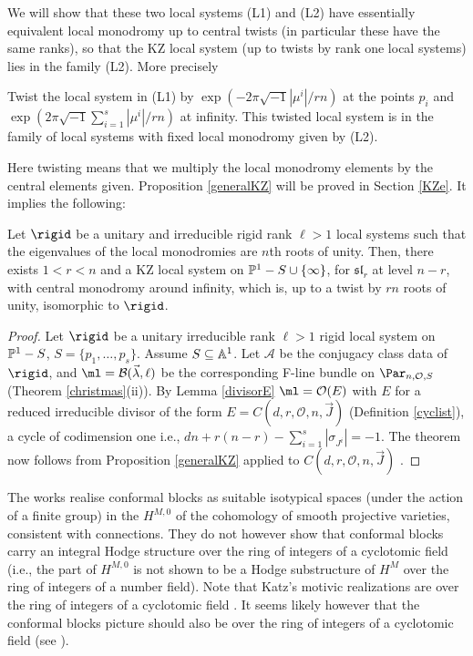 We will show that these two local systems (L1) and (L2) have essentially equivalent local monodromy up to central twists (in particular these have the same ranks), so that the KZ local system
(up to twists by rank one local systems) lies in the family (L2). More precisely
\begin{proposition}
\notready\label{generalKZ}
Twist the local system in (L1) by $\exp(-2\pi\sqrt{-1}|\mu^i|/rn)$ at the points $p_i$ and $\exp(2\pi\sqrt{-1}\sum_{i=1}^s |\mu^i|/rn)$ at infinity. This twisted local system is in the family of local systems with fixed local monodromy given by (L2).
\end{proposition}
Here twisting means that we multiply the local monodromy elements by the central elements given.
Proposition \ref{generalKZ} will be proved in Section \ref{KZe}. It implies the following:
\begin{theorem}
\notready\label{KZe}
Let $\rigid$ be a unitary and irreducible rigid rank $\ell>1$ local systems such that the eigenvalues of the local monodromies are  $n$th roots of unity.  Then, there exists $1<r<n$ and a KZ local system on $\Bbb{P}^1-S\cup\{\infty\}$, for $\mathfrak{sl}_r$ at level $n-r$, with central monodromy
around infinity, which is, up to a twist by  $rn$ roots of unity, isomorphic to $\rigid$.
\end{theorem}
\begin{proof}
Let $\rigid$ be a unitary irreducible  rank $\ell>1$ rigid local system on $\Bbb{P}^1-S$, $S=\{p_1,\dots,p_s\}$. Assume $S\subseteq \Bbb{A}^1$. Let $\mathcal{A}$ be the conjugacy class data of
$\rigid$, and $\ml=\mathcal{B}(\vec{\lambda},\ell)$ be the corresponding F-line bundle on $\Par_{n,\mathcal{O},S}$ (Theorem \ref{christmas}(ii)).  By Lemma \ref{divisorE} $\ml=\mathcal{O}(E)$ with $E$ for a reduced irreducible divisor of the form  $E=C(d,r,\mathcal{O},n,\vec{J})$ (Definition  \ref{cyclist}), a cycle  of codimension one i.e., $dn +r(n-r)-\sum_{i=1}^s |\sigma_{J^i}|=-1$. The theorem now follows from Proposition \ref{generalKZ} applied to $C(d,r,\mathcal{O},n,\vec{J})$ .
\end{proof}

\begin{remark}
\notready\label{hodge}
The  works  \cite{Ram,BKZ,BM}   realise conformal blocks as suitable  isotypical spaces (under the action of a  finite group) in the $H^{M,0}$ of the cohomology of smooth projective varieties, consistent with connections. They do not however show that conformal blocks carry an integral Hodge structure over the ring of integers of a cyclotomic field (i.e., the part of $H^{M,0}$ is not shown to be a Hodge substructure of $H^M$ over the ring of integers of a number field). Note that Katz's motivic realizations are over the ring of integers of a cyclotomic field \cite[Theorem 8.4.1]{Katz}. It seems likely however that the conformal blocks picture should also be over the ring of integers of a cyclotomic field (see \cite[Question 6.2]{Loo}).
\end{remark}


